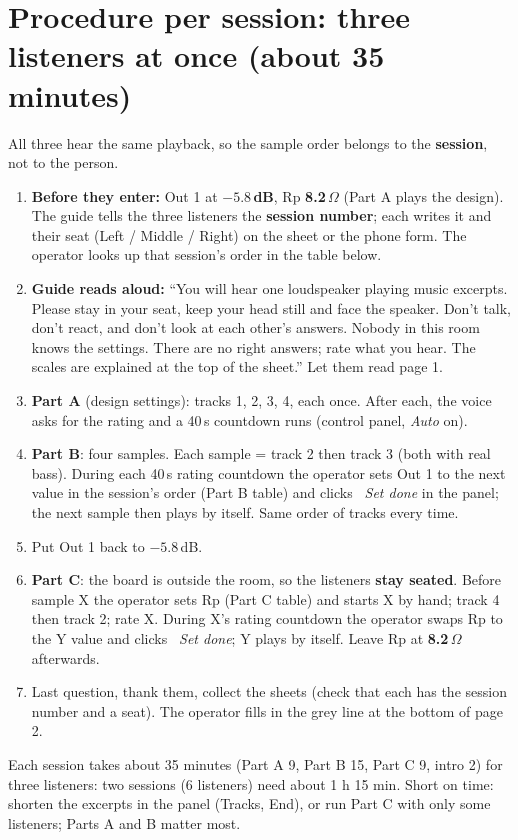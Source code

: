 \documentclass[11pt,a4paper]{article}
\begin{document}
\section{Procedure per session: three listeners at once (about 35 minutes)}
All three hear the same playback, so the sample order belongs to the \textbf{session}, not to the person.
\begin{enumerate}[itemsep=2pt]
\item \textbf{Before they enter:} Out 1 at \textbf{$-5.8$\,dB}, Rp \textbf{8.2\,$\Omega$} (Part A plays the design).
The guide tells the three listeners the \textbf{session number}; each writes it and their seat (Left / Middle / Right) on the sheet or the phone form.
The operator looks up that session's order in the table below.
\item \textbf{Guide reads aloud:} ``You will hear one loudspeaker playing music excerpts. Please stay in your seat, keep your head still and face
the speaker. Don't talk, don't react, and don't look at each other's answers. Nobody in this room knows the settings. There are no right
answers; rate what you hear. The scales are explained at the top of the sheet.'' Let them read page 1.
\item \textbf{Part A} (design settings): tracks 1, 2, 3, 4, each once. After each, the voice asks for the rating and a 40\,s countdown runs (control panel, \emph{Auto} on).
\item \textbf{Part B}: four samples. Each sample = track 2 then track 3 (both with real bass). During each 40\,s rating countdown the operator sets Out 1 to the next
value in the session's order (Part B table) and clicks \emph{\checkmark\ Set done} in the panel; the next sample then plays by itself. Same order of tracks every time.
\item Put Out 1 back to $-5.8$\,dB.
\item \textbf{Part C}: the board is outside the room, so the listeners \textbf{stay seated}. Before sample X the operator sets Rp
(Part C table) and starts X by hand; track 4 then track 2; rate X. During X's rating countdown the operator swaps Rp to the Y value and
clicks \emph{\checkmark\ Set done}; Y plays by itself. Leave Rp at \textbf{8.2\,$\Omega$} afterwards.
\item Last question, thank them, collect the sheets (check that each has the session number and a seat). The operator fills in the grey line at the bottom of page 2.
\end{enumerate}
Each session takes about 35 minutes (Part A 9, Part B 15, Part C 9, intro 2) for three listeners: two sessions (6 listeners) need about 1 h 15 min. Short on time: shorten the excerpts in the panel (Tracks, End), or run Part C with only some listeners; Parts A and B matter most.
\end{document}
